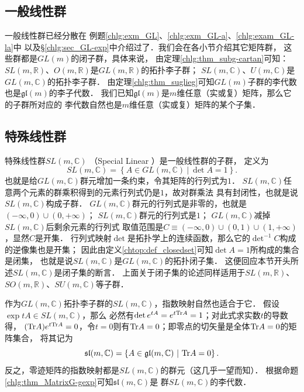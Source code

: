 \subsection{一般线性群} %
一般线性群已经分散在
例题\ref{chlg:exm_GL}、\ref{chlg:exm_GL-a}、\ref{chlg:exam_GL-la}中
以及\S\ref{chlg:sec_GL-exp}中介绍过了．我们会在各小节介绍其它矩阵群，
这些群都是$GL(m)$的闭子群，具体来说，
由定理\ref{chlg:thm_subg-cartan}可知：
$SL(m,\mathbb{R})$、$O(m,\mathbb{R})$是$GL(m,\mathbb{R})$的拓扑李子群；
$SL(m,\mathbb{C})$、$U(m,\mathbb{C})$是$GL(m,\mathbb{C})$的拓扑李子群．
由定理\ref{chlg:thm_suglieg}可知$GL(m)$子群的李代数也是$\mathfrak{gl}(m)$的李子代数．
我们已知$\mathfrak{gl}(m)$是$m$维任意（实或复）矩阵，那么它的子群所对应的
李代数自然也是$m$维任意（实或复）矩阵的某个子集．






\subsection{特殊线性群}\label{chlg:sec_SL}
特殊线性群$SL(m,\mathbb{C})$ （Special Linear ）是一般线性群的子群，
定义为
\begin{equation}
    SL(m,\mathbb{C}) = \left\{ A \in GL(m,\mathbb{C})\ |\ \det A =1 \right\} .
\end{equation}
也就是给$GL(m,\mathbb{C})$群元增加一条约束，令其矩阵的行列式为$1$．
$SL(m,\mathbb{C})$任意两个元素的群乘积得到的元素行列式仍是$1$，故对群乘法
具有封闭性，也就是说$SL(m,\mathbb{C})$构成子群．
$GL(m,\mathbb{C})$群元的行列式是非零的，也就是$(-\infty,0)\cup (0,+\infty)$；
$SL(m,\mathbb{C})$群元的行列式是$1$；
$GL(m,\mathbb{C})$减掉$SL(m,\mathbb{C})$后剩余元素的行列式
取值范围是$C\equiv (-\infty,0)\cup (0,1)\cup (1,+\infty)$，显然$C$是开集．
行列式映射$\det$是拓扑学上的连续函数，那么它的$\det^{-1}C$构成的逆像集也是开集；
因此由定义\ref{chtop:def_closedset}可知$\det A =1$所构成的集合是{\kaishu 闭集}，
也就是说$SL(m,\mathbb{C})$是$GL(m,\mathbb{C})$的拓扑闭子集．
这便回应本节开头所述$SL(m,\mathbb{C})$是闭子集的断言．
上面关于闭子集的论述同样适用于$SL(m,\mathbb{R})$、
$SO(m,\mathbb{R})$、$SU(m,\mathbb{C})$等子群．


作为$GL(m,\mathbb{C})$拓扑李子群的$SL(m,\mathbb{C})$，指数映射自然也适合于它．
假设$\exp tA \in SL(m,\mathbb{C})$，那么
必然有$\det e^{tA} =e^{t {\rm Tr}A} =1$；对此式求实数$t$的导数得，
$({\rm Tr}A) e^{t {\rm Tr}A} =0$，令$t=0$则有${\rm Tr}A=0$；即零点的切矢量是全体${\rm Tr}A=0$的矩阵集合，
将其记为
\begin{equation}
    \mathfrak{sl}(m,\mathbb{C})= \left\{A\in\mathfrak{gl}(m,\mathbb{C})\ |\ {\rm Tr} A =0 \right\} .
\end{equation}
反之，零迹矩阵的指数映射都是$SL(m,\mathbb{C})$的群元（这几乎一望而知）．
根据命题\ref{chlg:thm_MatrixG-gexp}可知$\mathfrak{sl}(m,\mathbb{C})$是
群$SL(m,\mathbb{C})$的李代数．

